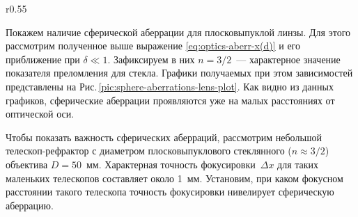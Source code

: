 \begin{wrapfigure}[12]{r}{0.55\tw}
    \centering
    \vspace{-.5pc}
    \caption{}
    \label{pic:sphere-aberrations-lens-plot}
\end{wrapfigure}
Покажем наличие сферической аберрации для плосковыпуклой линзы. Для этого рассмотрим полученное выше выражение \eqref{eq:optics-aberr-x(d)} и его приближение при $\delta \ll 1$. Зафиксируем в них $n=3/2$~--- характерное значение показателя преломления для стекла. Графики получаемых при этом зависимостей представлены на Рис.\,\ref{pic:sphere-aberrations-lens-plot}. Как видно из данных графиков, сферические аберрации проявляются уже на малых расстояниях от оптической оси.

Чтобы показать важность сферических аберраций, рассмотрим небольшой телескоп-рефрактор с диаметром плос\-ко\-вы\-пук\-ло\-во\-го стеклянного ($n \approx 3/2$) объектива $D = 50$~мм. Характерная точность фокусировки~$\Delta x$ для таких маленьких телескопов составляет около 1~мм. Установим, при каком фокусном расстоянии такого телескопа точность фокусировки нивелирует сферическую аберрацию.

